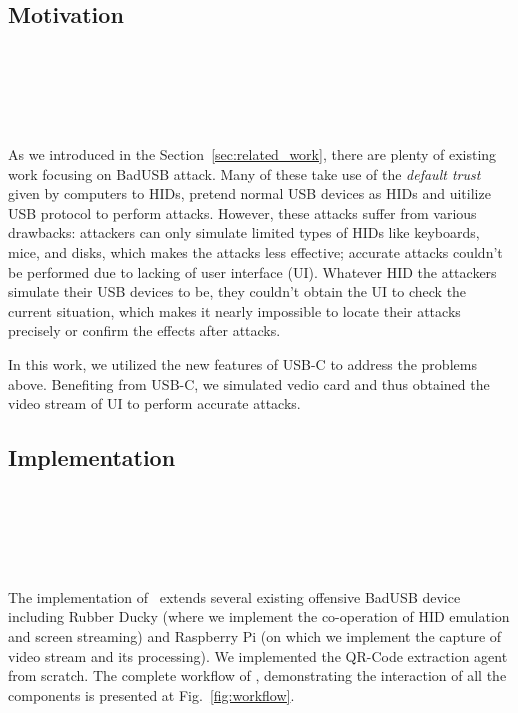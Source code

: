 \section{\tool}
\label{sec:badusb}
\subsection{Motivation}
\noindent{}\\
\\
\\
\\
\\
As we introduced in the Section~\ref{sec:related_work}, there are plenty of existing work  focusing on BadUSB attack. 
Many of these take use of the \textit{default trust} given by computers to HIDs, pretend normal USB devices as HIDs and uitilize USB protocol to perform attacks. 
However, these attacks suffer from various drawbacks:
 attackers can only simulate limited types of HIDs like keyboards, mice, and disks, which makes the attacks less effective;
 accurate attacks couldn't be performed due to lacking of user interface (UI).
Whatever HID the attackers simulate their USB devices to be, they couldn't obtain the UI to check the current situation, which makes it nearly impossible to locate their attacks precisely or confirm the effects after attacks.

In this work, we utilized the new features of USB-C to address the problems above.
Benefiting from USB-C, we simulated vedio card and thus obtained the video stream of UI to perform accurate attacks.

\subsection{Implementation}
\noindent{}\\
\\
\\
\\
\\
The implementation of \tool\ extends several existing offensive BadUSB device including Rubber Ducky (where we implement the co-operation of HID emulation and screen streaming) and Raspberry Pi (on which we implement the capture of video stream and its processing). We implemented the QR-Code extraction agent from scratch. The complete workflow of \tool, demonstrating the interaction of all the components is presented at Fig.~\ref{fig:workflow}.

